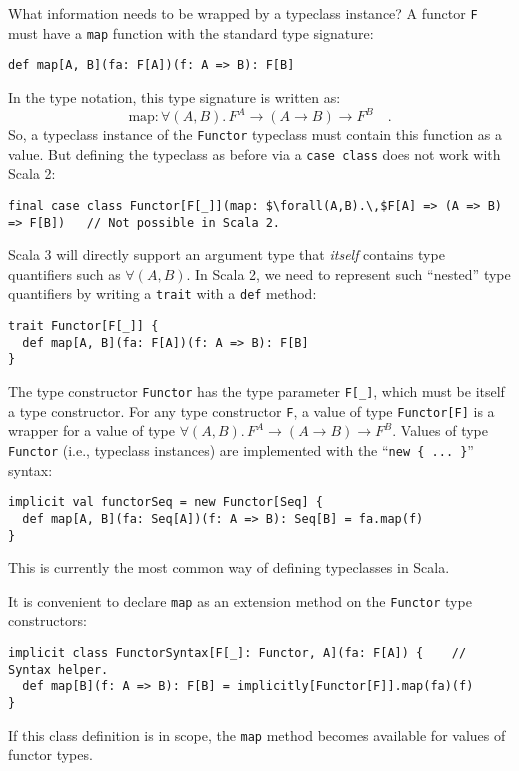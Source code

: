 What information needs to be wrapped by a typeclass instance? A functor
\lstinline!F! must have a \lstinline!map! function with the standard
type signature:
\begin{lstlisting}
def map[A, B](fa: F[A])(f: A => B): F[B]
\end{lstlisting}
In the type notation, this type signature is written as:
\[
\text{map}:\forall(A,B).\,F^{A}\rightarrow\left(A\rightarrow B\right)\rightarrow F^{B}\quad.
\]
So, a typeclass instance of the \lstinline!Functor! typeclass must
contain this function as a value. But defining the typeclass as before
via a \lstinline!case class! does not work with Scala 2:
\begin{lstlisting}[mathescape=true]
final case class Functor[F[_]](map: $\forall(A,B).\,$F[A] => (A => B) => F[B])   // Not possible in Scala 2.
\end{lstlisting}
Scala 3 will directly support an argument type that \emph{itself}
contains type quantifiers such as $\forall(A,B)$. In Scala 2, we
need to represent such \textsf{``}nested\textsf{''} type quantifiers by writing a
\lstinline!trait! with a \lstinline!def! method:
\begin{lstlisting}
trait Functor[F[_]] {
  def map[A, B](fa: F[A])(f: A => B): F[B]
}
\end{lstlisting}
The type constructor \lstinline!Functor! has the type parameter \lstinline!F[_]!,
which must be itself a type constructor. For any type constructor
\lstinline!F!, a value of type \lstinline!Functor[F]! is a wrapper
for a value of type $\forall(A,B).\,F^{A}\rightarrow\left(A\rightarrow B\right)\rightarrow F^{B}$.
Values of type \lstinline!Functor! (i.e., typeclass instances) are
implemented with the \textsf{``}\lstinline!new { ... }!\textsf{''} syntax:
\begin{lstlisting}
implicit val functorSeq = new Functor[Seq] {
  def map[A, B](fa: Seq[A])(f: A => B): Seq[B] = fa.map(f)
}
\end{lstlisting}
This is currently the most common way of defining typeclasses in Scala.

It is convenient to declare \lstinline!map! as an extension method
on the \lstinline!Functor! type constructors:
\begin{lstlisting}
implicit class FunctorSyntax[F[_]: Functor, A](fa: F[A]) {    // Syntax helper.
  def map[B](f: A => B): F[B] = implicitly[Functor[F]].map(fa)(f)
}
\end{lstlisting}
If this class definition is in scope, the \lstinline!map! method
becomes available for values of functor types.

